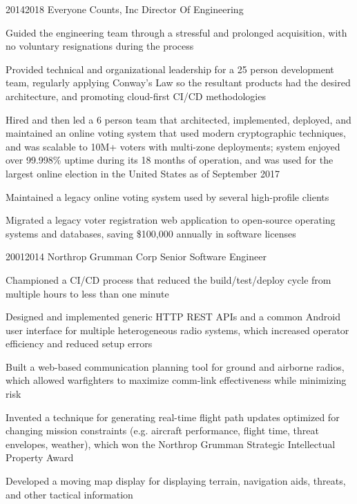 \documentclass{article}
\begin{document}
\job
  {2014}{2018}
  {Everyone Counts, Inc}
  {Director Of Engineering}
  {\begin{achievements}
    \item Guided the engineering team through a stressful and prolonged acquisition, with no voluntary resignations during the process
    \item Provided technical and organizational leadership for a 25 person development team, regularly applying Conway's Law so the resultant products had the desired architecture, and promoting cloud-first CI/CD methodologies
    \item Hired and then led a 6 person team that architected, implemented, deployed, and maintained an online voting system that used modern cryptographic techniques, and was scalable to 10M+ voters with multi-zone deployments; system enjoyed over 99.998\% uptime during its 18 months of operation, and was used for the largest online election in the United States as of September 2017
    \item Maintained a legacy online voting system used by several high-profile clients
    \item Migrated a legacy voter registration web application to open-source operating systems and databases, saving \$100,000 annually in software licenses
  \end{achievements}}

\job
  {2001}{2014}
  {Northrop Grumman Corp}
  {Senior Software Engineer}
  {\begin{achievements}
    \item Championed a CI/CD process that reduced the build/test/deploy cycle from multiple hours to less than one minute
    \item Designed and implemented generic HTTP REST APIs and a common Android user interface for multiple heterogeneous radio systems, which increased operator efficiency and reduced setup errors
    \item Built a web-based communication planning tool for ground and airborne radios, which allowed warfighters to maximize comm-link effectiveness while minimizing risk
    \item Invented a technique for generating real-time flight path updates optimized for changing mission constraints (e.g. aircraft performance, flight time, threat envelopes, weather), which won the Northrop Grumman Strategic Intellectual Property Award
    \item Developed a moving map display for displaying terrain, navigation aids, threats, and other tactical information
  \end{achievements}}
\end{document}
